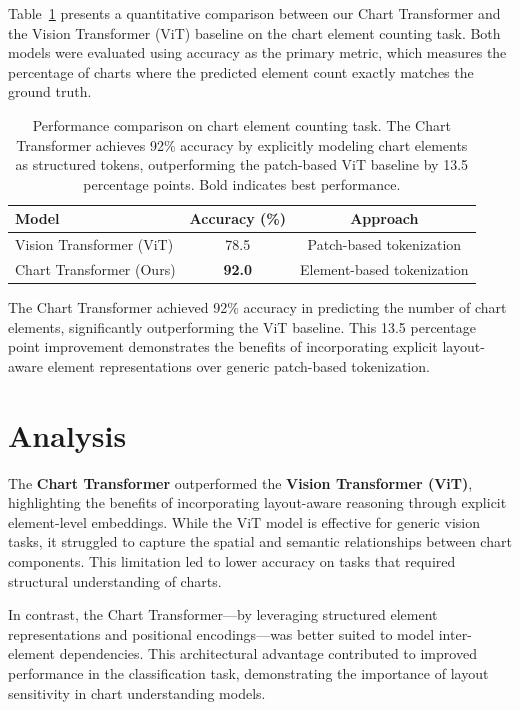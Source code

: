 \documentclass[11pt]{article}
\begin{document}
Table~\ref{tab:results} presents a quantitative comparison between our Chart Transformer and the Vision Transformer (ViT) baseline on the chart element counting task. Both models were evaluated using accuracy as the primary metric, which measures the percentage of charts where the predicted element count exactly matches the ground truth.

\begin{table}[h]
\centering
\begin{tabular}{lcc}
\toprule
\textbf{Model} & \textbf{Accuracy (\%)} & \textbf{Approach} \\
\midrule
Vision Transformer (ViT) & 78.5 & Patch-based tokenization \\
Chart Transformer (Ours) & \textbf{92.0} & Element-based tokenization \\
\bottomrule
\end{tabular}
\caption{Performance comparison on chart element counting task. The Chart Transformer achieves 92\% accuracy by explicitly modeling chart elements as structured tokens, outperforming the patch-based ViT baseline by 13.5 percentage points. Bold indicates best performance.}
\label{tab:results}
\end{table}

The Chart Transformer achieved 92\% accuracy in predicting the number of chart elements, significantly outperforming the ViT baseline. This 13.5 percentage point improvement demonstrates the benefits of incorporating explicit layout-aware element representations over generic patch-based tokenization.


\section{Analysis} 

The \textbf{Chart Transformer} outperformed the \textbf{Vision Transformer (ViT)}, highlighting the benefits of incorporating layout-aware reasoning through explicit element-level embeddings. While the ViT model is effective for generic vision tasks, it struggled to capture the spatial and semantic relationships between chart components. This limitation led to lower accuracy on tasks that required structural understanding of charts.

In contrast, the Chart Transformer—by leveraging structured element representations and positional encodings—was better suited to model inter-element dependencies. This architectural advantage contributed to improved performance in the classification task, demonstrating the importance of layout sensitivity in chart understanding models.
\end{document}
